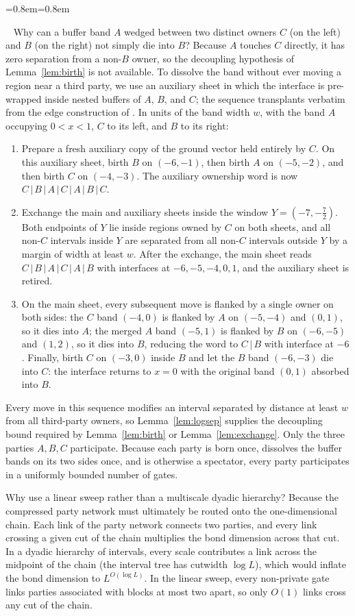 \documentclass[aps,prx,reprint,superscriptaddress,floatfix,nofootinbib,longbibliography,amsmath,amssymb]{revtex4-2}
\theoremstyle{plain}
\theoremstyle{definition}
\newenvironment{inwords}{%
  \par\medskip\noindent
  \begin{list}{}{\leftmargin=0.8em\rightmargin=0.8em}
  \item\relax
  \noindent{\sffamily\bfseries\color{blue!40!black}In words.}\ \sffamily\small}{%
  \end{list}\par\medskip}
\begin{document}
\begin{inwords}
Why can a buffer band $A$ wedged between two distinct owners $C$ (on the
left) and $B$ (on the right) not simply die into $B$? Because $A$ touches
$C$ directly, it has zero separation from a non-$B$ owner, so the
decoupling hypothesis of Lemma~\ref{lem:birth} is not available. To dissolve the band without
ever moving a region near a third party, we use an auxiliary sheet \cite{PP}
in which the interface is pre-wrapped inside nested buffers of $A$, $B$, and
$C$; the sequence transplants verbatim from the edge construction of
\cite{PP}. In units of the band width $w$, with the band $A$ occupying $0<x<1$,
$C$ to its left, and $B$ to its right:
\begin{enumerate}[leftmargin=2em,itemsep=0pt]
\item Prepare a fresh auxiliary copy of the ground vector held entirely by
$C$. On this auxiliary sheet, birth $B$ on $(-6,-1)$, then birth $A$ on
$(-5,-2)$, and then birth $C$ on $(-4,-3)$. The auxiliary ownership word is
now $C\,|\,B\,|\,A\,|\,C\,|\,A\,|\,B\,|\,C$.
\item Exchange the main and auxiliary sheets inside the window
$Y=(-7,-\tfrac72)$. Both endpoints of $Y$ lie inside regions owned by $C$ on
both sheets, and all non-$C$ intervals inside $Y$ are separated from all
non-$C$ intervals outside $Y$ by a margin of width at least $w$. After the
exchange, the main sheet reads $C\,|\,B\,|\,A\,|\,C\,|\,A\,|\,B$ with
interfaces at $-6,-5,-4,0,1$, and the auxiliary sheet is retired.
\item On the main sheet, every subsequent move is flanked by a single owner
on both sides: the $C$ band $(-4,0)$ is flanked by $A$ on $(-5,-4)$ and
$(0,1)$, so it dies into $A$; the merged $A$ band $(-5,1)$ is flanked by $B$
on $(-6,-5)$ and $(1,2)$, so it dies into $B$, reducing the word to $C\,|\,B$
with interface at $-6$. Finally, birth $C$ on $(-3,0)$ inside $B$ and let
the $B$ band $(-6,-3)$ die into $C$: the interface returns to $x=0$ with the
original band $(0,1)$ absorbed into $B$.
\end{enumerate}
Every move in this sequence modifies an interval separated by distance at
least $w$ from all third-party owners, so Lemma~\ref{lem:logsep} supplies
the decoupling bound required by Lemma~\ref{lem:birth} or
Lemma~\ref{lem:exchange}. Only the three parties $A,B,C$ participate. Because
each party is born once, dissolves the buffer bands on its two sides once,
and is otherwise a spectator, every party participates in a uniformly bounded
number of gates.

Why use a linear sweep rather than a multiscale dyadic hierarchy? Because
the compressed party network must ultimately be routed onto the
one-dimensional chain. Each link of the party network connects two parties,
and every link crossing a given cut of the chain multiplies the bond
dimension across that cut. In a dyadic hierarchy of intervals, every scale
contributes a link across the midpoint of the chain (the interval tree has
cutwidth $\log L$), which would inflate the bond dimension to
$L^{O(\log L)}$. In the linear sweep, every non-private gate links parties
associated with blocks at most two apart, so only $O(1)$ links cross any cut
of the chain.
\end{inwords}
\end{document}
